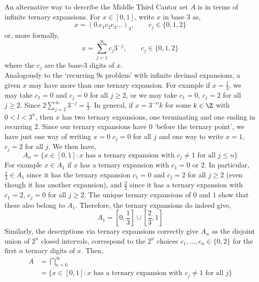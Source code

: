
\noindent
An alternative way to dercribe the Middle Third Cantor set $A$ is in terms of infinite ternary expansions. For $x \in [0, 1]$, write $x$ in base $3$ as,
$$ x = (0.c_1c_2c_3 \dots)_3, \qquad c_j \in \{0, 1, 2\} $$
or, more formally,
$$ x = \sum_{j=1}^\infty c_j3^{-j}, \qquad c_j \in \{0, 1, 2\} $$
where the $c_j$ are the base-$3$ digits of $x$.\\

\noindent
Analogously to the `recurring 9s problem' with infinite decimal expansions, a given $x$ may have more than one ternary expansion. For example if $x = \frac{1}{3}$, we may take $c_1 = 0$ and $c_j = 0$ for all $j \ge 2$, or we may take $c_1 = 0$, $c_j = 2$ for all $j \ge 2$. Since $2\sum_{j=2}^\infty 3^{-j} = \frac{1}{3}$. In general, if $x = 3^{-n}k$ for some $k \in \Z$
with $0 < l < 3^n$, then $x$ has two ternary expansions, one terminating and one ending in recurring $2$. Since our ternary expansions have $0$ `before the ternary point', we have just one way of writing $x = 0$ $c_j = 0$ for all $j$ and one way to write $x = 1$, $c_j = 2$ for all $j$. We then have,
$$ A_n = \{x \in [0, 1] : x \text{ has a ternary expansion with } c_j \ne 1 \text{ for all } j \le n\} $$
For example $x \in A_1$ if $x$ has a ternary expansion with $c_1 = 0$ or $2$. In particular, $\frac{1}{3}\in A_1$ since it has the ternary expansion $c_1 = 0$ and $c_j = 2$ for all $j \ge 2$ (even though it has another expansion), and $\frac{2}{3}$ since it has a ternary expansion with $c_1 = 2$, $c_j = 0$ for all
$j \ge 2$. The unique ternary expansions of $0$ and $1$ show that these also belong to $A_1$. Therefore, the ternary expansions do indeed give,
$$ A_1 = \left[ 0 , \frac{1}{3} \right] \cup \left[ \frac{2}{3}, 1 \right] $$
Similarly, the descriptions via ternary expansions correctly give $A_n$ as the disjoint union of $2^n$ closed intervals, correspond to the $2^n$ choices $c_1, \dots, c_n \in \{0 ,2 \}$ for the first $n$ ternary digits of $x$. Then,
\begin{align*}
  A &= \bigcap_{n=0}^\infty \\
  &= \{x \in [0, 1] : x \text{ has a ternary expansion with } c_j \ne 1 \text{ for all } j \}
\end{align*}

